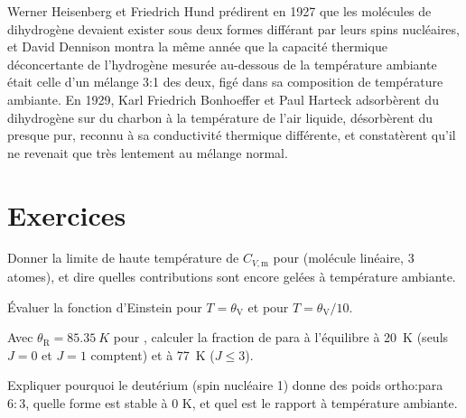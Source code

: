 \begin{history}
Werner Heisenberg et Friedrich Hund prédirent en 1927 que les molécules
de dihydrogène devaient exister sous deux formes différant par leurs
spins nucléaires, et David Dennison montra la même année que la capacité
thermique déconcertante de l'hydrogène mesurée au-dessous de la
température ambiante était celle d'un mélange 3:1 des deux, figé dans sa
composition de température ambiante. En 1929, Karl Friedrich Bonhoeffer
et Paul Harteck adsorbèrent du dihydrogène sur du charbon à la
température de l'air liquide, désorbèrent du  presque pur,
reconnu à sa conductivité thermique différente, et constatèrent qu'il ne
revenait que très lentement au mélange normal.
\end{history}

\section{Exercices}

\begin{exercise}[$\star$]\label{exo:b3:statistical-thermo-applied:1}
Donner la limite de haute température de $C_{V,\mathrm m}$ pour 
(molécule linéaire, 3 atomes), et dire quelles contributions sont encore
gelées à température ambiante.
\end{exercise}

\begin{exercise}[$\star$]\label{exo:b3:statistical-thermo-applied:2}
Évaluer la fonction d'Einstein pour $T = \theta_{\mathrm V}$ et pour $T = \theta_{\mathrm V}/10$.
\end{exercise}

\begin{exercise}[$\star$]\label{exo:b3:statistical-thermo-applied:3}
Avec $\theta_{\mathrm R} = \qty{85.35}{K}$ pour , calculer la
fraction de para à l'équilibre à
\qty{20}{K} (seuls $J = 0$ et $J = 1$ comptent) et à \qty{77}{K}
($J \le 3$).
\end{exercise}

\begin{exercise}[$\star$]\label{exo:b3:statistical-thermo-applied:4}
Expliquer pourquoi le deutérium (spin nucléaire 1) donne des poids ortho:para
$6 : 3$, quelle forme est stable à 0 K, et quel est le rapport à
température ambiante.
\end{exercise}

